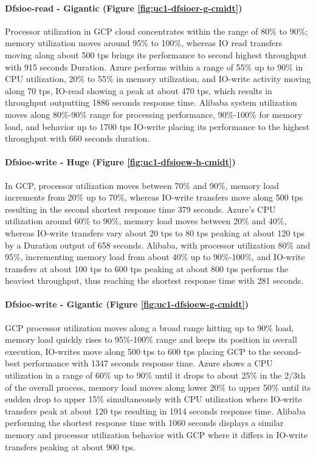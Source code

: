 \documentclass[review]{elsarticle}
\begin{document}
\paragraph{Dfsioe-read - Gigantic (Figure \ref{fig:uc1-dfsioer-g-cmidt})}Processor utilization in GCP cloud concentrates within the range of 80\% to 90\%; memory utilization moves around 95\% to 100\%, whereas IO read transfers moving along about 500 tps brings its performance to second highest throughput with 915 seconds Duration. Azure performs within a range of 55\% up to 90\% in CPU utilization, 20\% to 55\% in memory utilization, and IO-write activity moving along 70 tps, IO-read showing a peak at about 470 tps, which results in throughput outputting 1886 seconds response time. Alibaba system utilization moves along 80\%-90\% range for processing performance, 90\%-100\% for memory load, and behavior up to 1700 tps IO-write placing its performance to the highest throughput with 660 seconds duration.

\paragraph{Dfsioe-write - Huge (Figure \ref{fig:uc1-dfsioew-h-cmidt})}In GCP, processor utilization moves between 70\% and 90\%, memory load increments from 20\% up to 70\%, whereas IO-write transfers move along 500 tps resulting in the second shortest response time 379 seconds. Azure's CPU utilization around 60\% to 90\%, memory load moves between 20\% and 40\%, whereas IO-write transfers vary about 20 tps to 80 tps peaking at about 120 tps by a Duration output of 658 seconds. Alibaba, with processor utilization 80\% and 95\%, incrementing memory load from about 40\% up to 90\%-100\%, and IO-write transfers at about 100 tps to 600 tps peaking at about 800 tps performs the heaviest throughput, thus reaching the shortest response time with 281 seconds.

\paragraph{Dfsioe-write - Gigantic (Figure \ref{fig:uc1-dfsioew-g-cmidt})}GCP processor utilization moves along a broad range hitting up to 90\% load, memory load quickly rises to 95\%-100\% range and keeps its position in overall execution, IO-writes move along 500 tps to 600 tps placing GCP to the second-best performance with 1347 seconds response time. Azure shows a CPU utilization in a range of 60\% up to 90\% until it drops to about 25\% in the 2/3th of the overall process, memory load moves along lower 20\% to upper 50\% until its sudden drop to upper 15\% simultaneously with CPU utilization where IO-write transfers peak at about 120 tps resulting in 1914 seconds response time. Alibaba performing the shortest response time with 1060 seconds displays a similar memory and processor utilization behavior with GCP where it differs in IO-write transfers peaking at about 900 tps.
\end{document}
